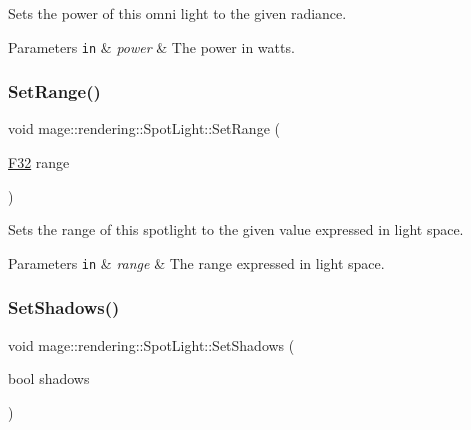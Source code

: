 Sets the power of this omni light to the given radiance.


\begin{DoxyParams}[1]{Parameters}
\mbox{\tt in}  & {\em power} & The power in watts. \\
\hline
\end{DoxyParams}
\mbox{\label{classmage_1_1rendering_1_1_spot_light_a87711b67a7a16809711f9841e4708720}} 
\subsubsection{\texorpdfstring{Set\+Range()}{SetRange()}}
{\footnotesize\ttfamily void mage\+::rendering\+::\+Spot\+Light\+::\+Set\+Range (\begin{DoxyParamCaption}\item[{\mbox{\hyperlink{namespacemage_aa97e833b45f06d60a0a9c4fc22ae02c0}{F32}}}]{range }\end{DoxyParamCaption})\hspace{0.3cm}{\ttfamily [noexcept]}}

Sets the range of this spotlight to the given value expressed in light space.


\begin{DoxyParams}[1]{Parameters}
\mbox{\tt in}  & {\em range} & The range expressed in light space. \\
\hline
\end{DoxyParams}
\mbox{\label{classmage_1_1rendering_1_1_spot_light_af1f1d3aee8bdcda50d16f4b0551e4728}} 
\subsubsection{\texorpdfstring{Set\+Shadows()}{SetShadows()}}
{\footnotesize\ttfamily void mage\+::rendering\+::\+Spot\+Light\+::\+Set\+Shadows (\begin{DoxyParamCaption}\item[{bool}]{shadows }\end{DoxyParamCaption})\hspace{0.3cm}{\ttfamily [noexcept]}}

